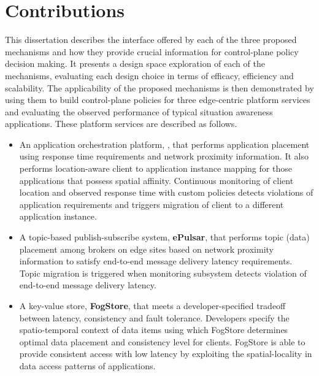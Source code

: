 \section{Contributions}
This dissertation describes the interface offered by each of the three proposed mechanisms and how they provide crucial information for control-plane policy decision making. It presents a design space exploration of each of the mechanisms, evaluating each design choice in terms of efficacy, efficiency and scalability. The applicability of the proposed mechanisms is then demonstrated by using them to build control-plane policies for three edge-centric platform services and evaluating the observed performance of typical situation awareness applications. These platform services are described as follows.
\begin{itemize}
\item An application orchestration platform, \oneedge{}, that performs application placement using response time requirements and network proximity information. It also performs location-aware client to application instance mapping for those applications that possess spatial affinity. Continuous monitoring of client location and observed response time with custom policies detects violations of application requirements and triggers migration of client to a different application instance. 
\item A topic-based publish-subscribe system, \textbf{ePulsar}, that performs topic (data) placement among brokers on edge sites based on network proximity information to satisfy end-to-end message delivery latency requirements. Topic migration is triggered when monitoring subsystem detects violation of end-to-end message delivery latency.
\item A key-value store, \textbf{FogStore}, that meets a developer-specified tradeoff between latency, consistency and fault tolerance. Developers specify the spatio-temporal context of data items using which FogStore determines optimal data placement and consistency level for clients. FogStore is able to provide consistent access with low latency by exploiting the spatial-locality in data access patterns of applications. 
\end{itemize}

